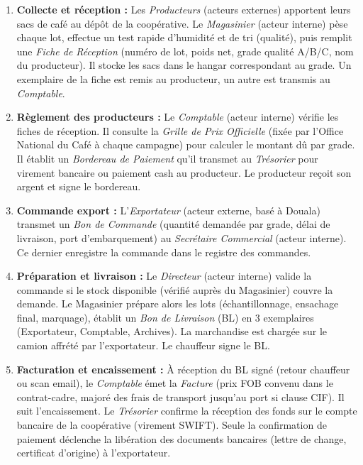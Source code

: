\documentclass[11pt]{article}
\begin{document}
\begin{enumerate}
    \item \textbf{Collecte et réception :} Les \emph{Producteurs} (acteurs externes) apportent leurs sacs de café au dépôt de la coopérative. Le \emph{Magasinier} (acteur interne) pèse chaque lot, effectue un test rapide d'humidité et de tri (qualité), puis remplit une \emph{Fiche de Réception} (numéro de lot, poids net, grade qualité A/B/C, nom du producteur). Il stocke les sacs dans le hangar correspondant au grade. Un exemplaire de la fiche est remis au producteur, un autre est transmis au \emph{Comptable}.
    \item \textbf{Règlement des producteurs :} Le \emph{Comptable} (acteur interne) vérifie les fiches de réception. Il consulte la \emph{Grille de Prix Officielle} (fixée par l'Office National du Café à chaque campagne) pour calculer le montant dû par grade. Il établit un \emph{Bordereau de Paiement} qu'il transmet au \emph{Trésorier} pour virement bancaire ou paiement cash au producteur. Le producteur reçoit son argent et signe le bordereau.
    \item \textbf{Commande export :} L'\emph{Exportateur} (acteur externe, basé à Douala) transmet un \emph{Bon de Commande} (quantité demandée par grade, délai de livraison, port d'embarquement) au \emph{Secrétaire Commercial} (acteur interne). Ce dernier enregistre la commande dans le registre des commandes.
    \item \textbf{Préparation et livraison :} Le \emph{Directeur} (acteur interne) valide la commande si le stock disponible (vérifié auprès du Magasinier) couvre la demande. Le Magasinier prépare alors les lots (échantillonnage, ensachage final, marquage), établit un \emph{Bon de Livraison} (BL) en 3 exemplaires (Exportateur, Comptable, Archives). La marchandise est chargée sur le camion affrété par l'exportateur. Le chauffeur signe le BL.
    \item \textbf{Facturation et encaissement :} À réception du BL signé (retour chauffeur ou scan email), le \emph{Comptable} émet la \emph{Facture} (prix FOB convenu dans le contrat-cadre, majoré des frais de transport jusqu'au port si clause CIF). Il suit l'encaissement. Le \emph{Trésorier} confirme la réception des fonds sur le compte bancaire de la coopérative (virement SWIFT). Seule la confirmation de paiement déclenche la libération des documents bancaires (lettre de change, certificat d'origine) à l'exportateur.
\end{enumerate}
\end{document}
